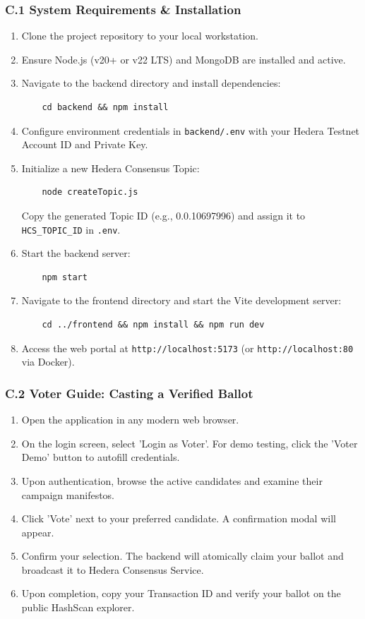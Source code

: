 \documentclass[12pt, a4paper]{article}
\begin{document}
\subsubsection{C.1 System Requirements \& Installation}
\begin{enumerate}[leftmargin=*]
    \item Clone the project repository to your local workstation.
    \item Ensure Node.js (v20+ or v22 LTS) and MongoDB are installed and active.
    \item Navigate to the backend directory and install dependencies:
    \begin{verbatim}
    cd backend && npm install
    \end{verbatim}
    \item Configure environment credentials in \texttt{backend/.env} with your Hedera Testnet Account ID and Private Key.
    \item Initialize a new Hedera Consensus Topic:
    \begin{verbatim}
    node createTopic.js
    \end{verbatim}
    Copy the generated Topic ID (e.g., 0.0.10697996) and assign it to \texttt{HCS\_TOPIC\_ID} in \texttt{.env}.
    \item Start the backend server:
    \begin{verbatim}
    npm start
    \end{verbatim}
    \item Navigate to the frontend directory and start the Vite development server:
    \begin{verbatim}
    cd ../frontend && npm install && npm run dev
    \end{verbatim}
    \item Access the web portal at \texttt{http://localhost:5173} (or \texttt{http://localhost:80} via Docker).
\end{enumerate}

\subsubsection{C.2 Voter Guide: Casting a Verified Ballot}
\begin{enumerate}[leftmargin=*]
    \item Open the application in any modern web browser.
    \item On the login screen, select 'Login as Voter'. For demo testing, click the 'Voter Demo' button to autofill credentials.
    \item Upon authentication, browse the active candidates and examine their campaign manifestos.
    \item Click 'Vote' next to your preferred candidate. A confirmation modal will appear.
    \item Confirm your selection. The backend will atomically claim your ballot and broadcast it to Hedera Consensus Service.
    \item Upon completion, copy your Transaction ID and verify your ballot on the public HashScan explorer.
\end{enumerate}
\end{document}
